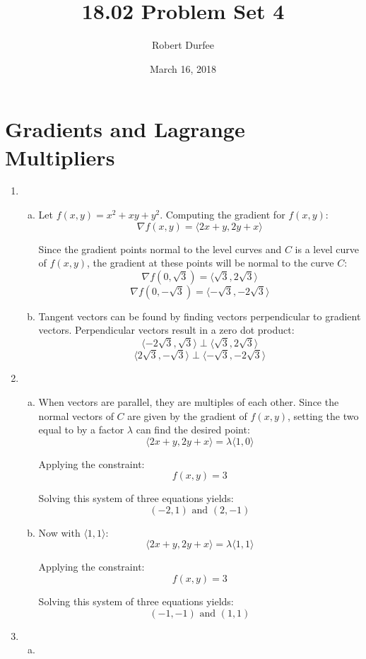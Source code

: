 \documentclass{article}
\title{ 18.02 Problem Set 4 }
\author{ Robert Durfee }
\date{ March 16, 2018 }
\begin{document}
\maketitle

\section{ Gradients and Lagrange Multipliers }

\begin{enumerate}[1.]
  \item \begin{enumerate}[a.]
    \item Let $f(x,y) = x^{2} + xy + y^{2}$. Computing the gradient for $f(x,
      y)$:
      $$ \nabla f(x, y) = \langle 2x + y, 2y + x \rangle $$

      Since the gradient points normal to the level curves and $C$ is a level
      curve of $f(x, y)$, the gradient at these points will be normal to the
      curve $C$:
      $$ \nabla f(0, \sqrt{3}) = \langle \sqrt{3}, 2 \sqrt{3} \rangle $$
      $$ \nabla f(0, -\sqrt{3}) = \langle -\sqrt{3}, -2 \sqrt{3} \rangle $$

    \item Tangent vectors can be found by finding vectors perpendicular to
      gradient vectors. Perpendicular vectors result in a zero dot product:
      $$ \langle -2\sqrt{3}, \sqrt{3} \rangle \perp \langle \sqrt{3}, 2\sqrt{3}
      \rangle $$
      $$ \langle 2 \sqrt{3}, -\sqrt{3} \rangle \perp \langle -\sqrt{3}, -2
      \sqrt{3} \rangle $$
    \end{enumerate}
  \item \begin{enumerate}[a.]
      \item When vectors are parallel, they are multiples of each other. Since
        the normal vectors of $C$ are given by the gradient of $f(x, y)$,
        setting the two equal to by a factor $\lambda$ can find the desired
        point:
        $$ \langle 2x + y, 2y + x \rangle = \lambda \langle 1, 0 \rangle $$

        Applying the constraint:
        $$ f(x, y) = 3 $$

        Solving this system of three equations yields:
        $$ (-2, 1) \textrm{ and } (2, -1) $$

      \item Now with $\langle 1, 1 \rangle$:
        $$ \langle 2x + y, 2y + x \rangle = \lambda \langle 1, 1 \rangle $$

        Applying the constraint:
        $$ f(x, y) = 3 $$

        Solving this system of three equations yields:
        $$ (-1, -1) \textrm{ and } (1, 1) $$
    \end{enumerate}
  \item \begin{enumerate}[a.]
      \item
    \end{enumerate}
\end{enumerate}
\end{document}
